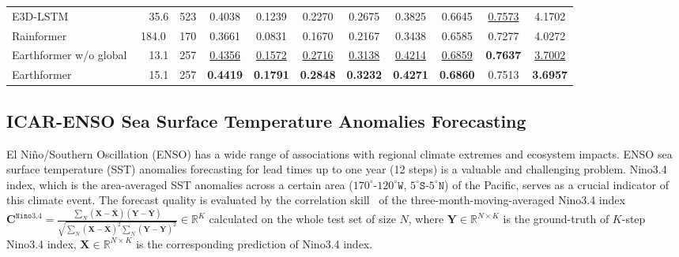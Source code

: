 \documentclass{article}
\def\Cnino{\bm{C}^{\mathtt{Nino3.4}}}
\begin{document}
\begin{table}[!tb]
\begin{center}
{\begin{tabular}{l|c|c|cccccccc}
	E3D-LSTM~\cite{wang2018eidetic}     &\ \ 35.6   & 523	& 0.4038				& 0.1239				& 0.2270				& 0.2675				& 0.3825				& 0.6645				& \underline{0.7573}	& 4.1702				\\
	Rainformer~\cite{bai2022rainformer} & 184.0     & 170   & 0.3661				& 0.0831				& 0.1670				& 0.2167				& 0.3438				& 0.6585				& 0.7277				& 4.0272				\\
	\midrule
	Earthformer w/o global	            &\ \ 13.1   & 257	& \underline{0.4356}	& \underline{0.1572}	& \underline{0.2716}	& \underline{0.3138}	& \underline{0.4214}	& \underline{0.6859}	& \textbf{0.7637}		& \underline{3.7002}	\\
	Earthformer			                &\ \ 15.1   & 257	& \textbf{0.4419}		& \textbf{0.1791}		& \textbf{0.2848}		& \textbf{0.3232}		& \textbf{0.4271}		& \textbf{0.6860}		& 0.7513				& \textbf{3.6957}		\\
	\bottomrule[1.5pt]
	\end{tabular}
	}
	\vspace{-1em}
\end{center}
\end{table}

\subsection{ICAR-ENSO Sea Surface Temperature Anomalies Forecasting}
El Niño/Southern Oscillation (ENSO) has a wide range of associations with regional climate extremes and ecosystem impacts.
ENSO sea surface temperature (SST) anomalies forecasting for lead times up to one year (12 steps) is a valuable and challenging problem. Nino3.4 index, which is the area-averaged SST anomalies across a certain area ($170^\circ$-$120^\circ\mathtt{W}$, $5^\circ\mathtt{S}$-$5^\circ\mathtt{N}$) of the Pacific, serves as a crucial indicator of this climate event. 
The forecast quality is evaluated by the correlation skill~\cite{ham2019deep} of the three-month-moving-averaged Nino3.4 index $\Cnino{} = \frac{\sum_N(\bm{X}-\bar{\bm{X}})(\bm{Y}-\bar{\bm{Y}})}{\sqrt{\sum_N(\bm{X}-\bar{\bm{X}})^2\sum_N(\bm{Y}-\bar{\bm{Y}})^2}}\in\mathbb{R}^K$ calculated on the whole test set of size $N$, where $\bm{Y}\in\mathbb{R}^{N\times K}$ is the ground-truth of $K$-step Nino3.4 index, $\bm{X}\in\mathbb{R}^{N\times K}$ is the corresponding prediction of Nino3.4 index.
\end{document}
